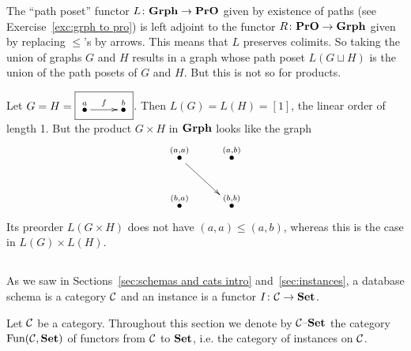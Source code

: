 \documentclass[CT4S-EN-RU]{subfiles}
\begin{document}
\begin{exampleRUS}
\end{exampleRUS}

\begin{exampleENG}
The “path poset” functor $L\colon{\mathbf{Grph}}\rightarrow{\mathbf{PrO}}$ given by existence of paths (see Exercise~\ref{exc:grph to pro}) is left adjoint to the functor $R\colon{\mathbf{PrO}}\rightarrow{\mathbf{Grph}}$ given by replacing $\leq$'s by arrows. This means that $L$ preserves colimits. So taking the union of graphs $G$ and $H$ results in a graph whose path poset  $L(G\sqcup H)$ is the union of the path posets of $G$ and $H$. But this is not so for products. 

Let $G=H=\fbox{\xymatrix{\LMO{a}\ar[r]^f&\LMO{b}}}$. Then $L(G)=L(H)=[1]$, the linear order of length 1. But the product $G\times H$ in ${\mathbf{Grph}}$ looks like the graph 
$$\xymatrix{\LMO{(a,a)}\ar[rd]&\LMO{(a,b)}\\\LMO{(b,a)}&\LMO{(b,b)}}$$
Its preorder $L(G\times H)$ does not have $(a,a)\leq(a,b)$, whereas this is the case in $L(G)\times L(H)$.
\end{exampleENG}

\begin{exampleRUS}
\end{exampleRUS}


\subsection{}\label{sec:data migration}

\begin{blockENG}
As we saw in Sections~\ref{sec:schemas and cats intro} and~\ref{sec:instances}, a database schema is a category $\mathcal{C}$ and an instance is a functor $I\colon\mathcal{C}\rightarrow{\mathbf{Set}}$.  
\end{blockENG}

\begin{blockRUS}
\end{blockRUS}

\begin{notationENG}
Let $\mathcal{C}$ be a category. Throughout this section we denote by $\mathcal{C}{\text \textendash}{\mathbf{Set}}$ the category $\textnormal{Fun}(\mathcal{C},{\mathbf{Set}})$ of functors from $\mathcal{C}$ to ${\mathbf{Set}}$, i.e. the category of instances on $\mathcal{C}$. 
\end{notationENG}

\begin{notationRUS}
\end{notationRUS}
\end{document}

